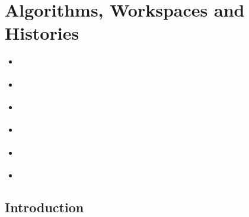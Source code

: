 \documentclass[letterpaper,10pt,english,openany]{sphinxmanual}
\begin{document}
\section{Algorithms, Workspaces and Histories}
\label{\detokenize{mantid_basic_course/algorithms_workspaces_and_histories/index:algorithms-workspaces-and-histories}}\label{\detokenize{mantid_basic_course/algorithms_workspaces_and_histories/index:id1}}\label{\detokenize{mantid_basic_course/algorithms_workspaces_and_histories/index::doc}}
\begin{itemize}
\item {} 
{\hyperref[\detokenize{mantid_basic_course/algorithms_workspaces_and_histories/01_introduction:introduction-awh}]{}}

\item {} 
{\hyperref[\detokenize{mantid_basic_course/algorithms_workspaces_and_histories/02_algorithms:algorithms}]{}}

\item {} 
{\hyperref[\detokenize{mantid_basic_course/algorithms_workspaces_and_histories/03_workspaces:workspaces}]{}}

\item {} 
{\hyperref[\detokenize{mantid_basic_course/algorithms_workspaces_and_histories/04_algorith_histories:algorith-histories}]{}}

\item {} 
{\hyperref[\detokenize{mantid_basic_course/algorithms_workspaces_and_histories/05_interfaces:interfaces}]{}}

\item {} 
{\hyperref[\detokenize{mantid_basic_course/algorithms_workspaces_and_histories/06_exercises_a:exercises-a}]{}}

\end{itemize}


\subsection{Introduction}
\label{\detokenize{mantid_basic_course/algorithms_workspaces_and_histories/01_introduction:introduction}}\label{\detokenize{mantid_basic_course/algorithms_workspaces_and_histories/01_introduction:introduction-awh}}\label{\detokenize{mantid_basic_course/algorithms_workspaces_and_histories/01_introduction::doc}}
\end{document}
